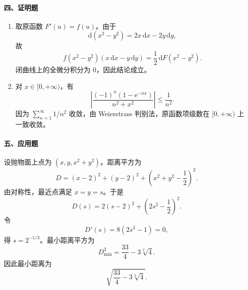 \paragraph*{四、证明题}
\begin{enumerate}
  \item 取原函数 \(F'(u)=f(u)\)。由于
  \[
    \mathrm{d}(x^2-y^2)=2x\,\mathrm{d}x-2y\,\mathrm{d}y,
  \]
  故
  \[
    f(x^2-y^2)(x\,\mathrm{d}x-y\,\mathrm{d}y)
    =\frac12\,\mathrm{d}F(x^2-y^2).
  \]
  闭曲线上的全微分积分为 \(0\)，因此结论成立。

  \item 对 \(x\in[0,+\infty)\)，有
  \[
    \left|\frac{(-1)^n(1-\mathrm{e}^{-nx})}{n^2+x^2}\right|
    \le\frac1{n^2}.
  \]
  因为 \(\sum_{n=1}^{\infty}1/n^2\) 收敛，由 Weierstrass 判别法，原函数项级数在 \([0,+\infty)\) 上一致收敛。
\end{enumerate}

\paragraph*{五、应用题}
设抛物面上点为 \((x,y,x^2+y^2)\)。距离平方为
\[
  D=(x-2)^2+(y-2)^2+\left(x^2+y^2-\frac12\right)^2.
\]
由对称性，最近点满足 \(x=y=s\)。于是
\[
  D(s)=2(s-2)^2+\left(2s^2-\frac12\right)^2.
\]
令
\[
  D'(s)=8(2s^3-1)=0,
\]
得 \(s=2^{-1/3}\)。最小距离平方为
\[
  D_{\min}^2=\frac{33}{4}-3\sqrt[3]{4}.
\]
因此最小距离为
\[
  \sqrt{\frac{33}{4}-3\sqrt[3]{4}}.
\]
